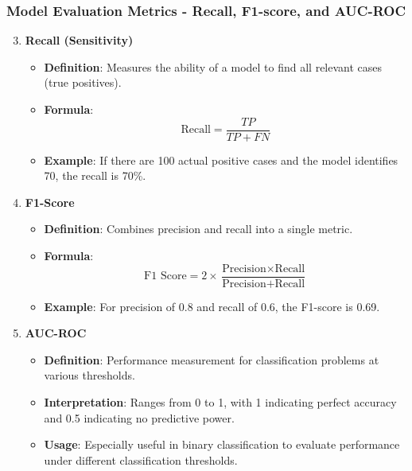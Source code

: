\documentclass[aspectratio=169]{beamer}
\begin{document}
\begin{frame}[fragile]
    \frametitle{Model Evaluation Metrics - Recall, F1-score, and AUC-ROC}
    \begin{enumerate}
        \setcounter{enumi}{2} %
        \item \textbf{Recall (Sensitivity)}
        \begin{itemize}
            \item \textbf{Definition}: Measures the ability of a model to find all relevant cases (true positives).
            \item \textbf{Formula}:
            \begin{equation}
                \text{Recall} = \frac{TP}{TP + FN}
            \end{equation}
            \item \textbf{Example}: If there are 100 actual positive cases and the model identifies 70, the recall is 70\%.
        \end{itemize}

        \item \textbf{F1-Score}
        \begin{itemize}
            \item \textbf{Definition}: Combines precision and recall into a single metric.
            \item \textbf{Formula}:
            \begin{equation}
                \text{F1 Score} = 2 \times \frac{\text{Precision} \times \text{Recall}}{\text{Precision} + \text{Recall}}
            \end{equation}
            \item \textbf{Example}: For precision of 0.8 and recall of 0.6, the F1-score is 0.69.
        \end{itemize}

        \item \textbf{AUC-ROC}
        \begin{itemize}
            \item \textbf{Definition}: Performance measurement for classification problems at various thresholds.
            \item \textbf{Interpretation}: Ranges from 0 to 1, with 1 indicating perfect accuracy and 0.5 indicating no predictive power.
            \item \textbf{Usage}: Especially useful in binary classification to evaluate performance under different classification thresholds.
        \end{itemize}
    \end{enumerate}
\end{frame}
\end{document}
